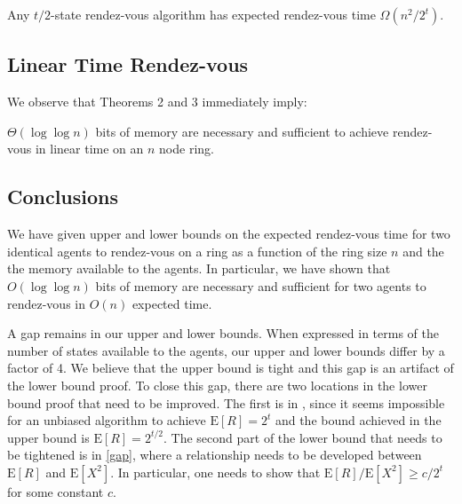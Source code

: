 \documentclass[lotsofwhite]{patmorin}
\newcommand{\E}{\mathrm{E}}
\begin{document}
\begin{thm}
Any $t/2$-state rendez-vous algorithm has expected rendez-vous time
$\Omega(n^2/2^{t})$.
\end{thm}

\subsection{Linear Time Rendez-vous}

We observe that Theorems 2 and 3 immediately imply:

\begin{thm}
$\Theta( \log \log n)$ bits of memory are necessary and sufficient to 
achieve rendez-vous in linear time on an $n$ node ring.
\end{thm}

\subsection{Conclusions}

We have given upper and lower bounds on the expected rendez-vous time
for two identical agents to rendez-vous on a ring as a function of the
ring size $n$ and the the memory available to the agents.  In
particular, we have shown that $O(\log\log n)$ bits of memory are
necessary and sufficient for two agents to rendez-vous in $O(n)$
expected time.

A gap remains in our upper and lower bounds.  When expressed in terms
of the number of states available to the agents, our upper and lower
bounds differ by a factor of 4.  We believe that the upper bound is
tight and this gap is an artifact of the lower bound proof.  To close
this gap, there are two locations in the lower bound proof that need
to be improved.  The first is in , since it seems
impossible for an unbiased algorithm to achieve $\E[R]=2^t$ and the
bound achieved in the upper bound is $\E[R] = 2^{t/2}$.  The second
part of the lower bound that needs to be tightened is in \eqref{gap},
where a relationship needs to be developed between $\E[R]$ and
$\E[X^2]$.  In particular, one needs to show that $\E[R]/\E[X^2] \ge
c/2^t$ for some constant $c$.



\end{document}
